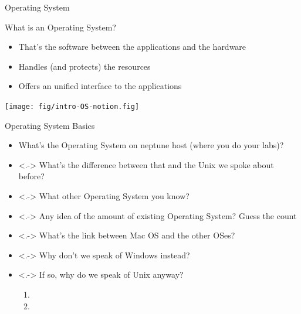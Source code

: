 \begin{frame}{Operating System}
  \begin{block}{What is an Operating System?}
    \begin{itemize}
    \item That's the software between the applications and the hardware
    \item Handles (and protects) the resources
    \item Offers an unified interface to the applications
    \end{itemize}
  \end{block}
  \centerline{\texttt{[image: fig/intro-OS-notion.fig]}}
\end{frame}
\begin{frame}{Operating System Basics}
  \begin{itemize}
  \item<+-> What's the Operating System on neptune host (where you do your labs)?\\
  \item<.-> What's the difference between that and the Unix we spoke about
    before?\\ 
  \item<.-> What other Operating System you know?\\
  \item<.-> Any idea of the amount of existing Operating System? Guess the
    count\\
  \item<.-> What's the link between Mac OS and the other OSes?\\
  \item<.-> Why don't we speak of Windows instead?\\
  \item<.-> If so, why do we speak of Unix anyway?
    \begin{enumerate}
    \item {}
    \item {}
    \end{enumerate}
  \end{itemize}
\end{frame}
